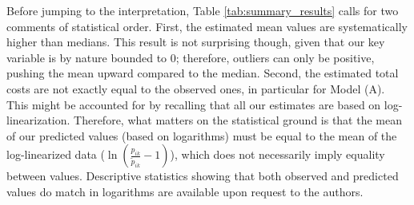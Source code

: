 \documentclass[a4paper,11pt]{article}
\begin{document}

Before jumping to the interpretation, Table \ref{tab:summary_results} calls for two comments of statistical order. First, the estimated mean values are systematically higher than medians. This result is not surprising though, given that our key variable is by nature bounded to 0; therefore, outliers can only be positive, pushing the mean upward compared to the median. Second, the estimated total costs are not exactly equal to the observed ones, in particular for Model (A). This might be accounted for by recalling that all our estimates are based on log-linearization. Therefore, what matters on the statistical ground is that the mean of our predicted values (based on logarithms) must be equal to the mean of the log-linearized data ($\ln\left(\frac{p_{ik}}{\widetilde{p}_{ik}}-1 \right)$), which does not necessarily imply equality between values.
Descriptive statistics showing that both observed and predicted values do match in logarithms are available upon request to the authors.
\end{document}
